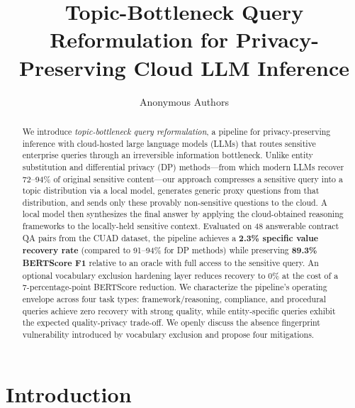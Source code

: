 \documentclass[sigconf,anonymous,review,balance=false]{acmart}
\begin{document}
\title[Topic-Bottleneck Query Reformulation]{Topic-Bottleneck Query Reformulation for Privacy-Preserving Cloud LLM Inference}

\author{Anonymous Authors}

\begin{abstract}
We introduce \emph{topic-bottleneck query reformulation}, a pipeline for privacy-preserving inference with cloud-hosted large language models (LLMs) that routes sensitive enterprise queries through an irreversible information bottleneck.
Unlike entity substitution and differential privacy (DP) methods---from which modern LLMs recover 72--94\% of original sensitive content---our approach compresses a sensitive query into a topic distribution via a local model, generates generic proxy questions from that distribution, and sends only these provably non-sensitive questions to the cloud.
A local model then synthesizes the final answer by applying the cloud-obtained reasoning frameworks to the locally-held sensitive context.
Evaluated on 48 answerable contract QA pairs from the CUAD dataset, the pipeline achieves a \textbf{2.3\% specific value recovery rate} (compared to 91--94\% for DP methods) while preserving \textbf{89.3\% BERTScore F1} relative to an oracle with full access to the sensitive query.
An optional vocabulary exclusion hardening layer reduces recovery to 0\% at the cost of a 7-percentage-point BERTScore reduction.
We characterize the pipeline's operating envelope across four task types: framework/reasoning, compliance, and procedural queries achieve zero recovery with strong quality, while entity-specific queries exhibit the expected quality-privacy trade-off.
We openly discuss the absence fingerprint vulnerability introduced by vocabulary exclusion and propose four mitigations.
\end{abstract}


\maketitle

\section{Introduction}
\label{sec:intro}
\end{document}

